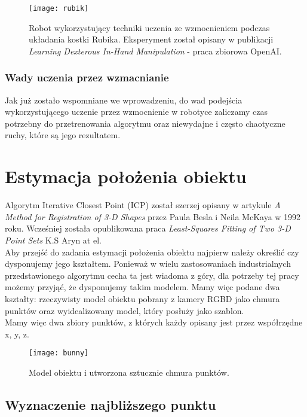\documentclass[12pt]{article}
\begin{document}
\begin{figure}[h]
\centering
\texttt{[image: rubik]}
\caption{Robot wykorzystujący techniki uczenia ze wzmocnieniem podczas układania kostki Rubika. Eksperyment został opisany w publikacji \emph{Learning Dexterous In-Hand Manipulation} - praca zbiorowa OpenAI.}
\end{figure}

\subsubsection{Wady uczenia przez wzmacnianie}
Jak już zostało wspomniane we wprowadzeniu, do wad podejścia wykorzystującego uczenie przez wzmocnienie w robotyce zaliczamy czas potrzebny do przetrenowania algorytmu oraz niewydajne i często chaotyczne ruchy, które są jego rezultatem.

\newpage
\section{Estymacja położenia obiektu}
Algorytm Iterative Closest Point (ICP) został szerzej opisany w artykule \emph{A Method for Registration of 3-D Shapes} przez Paula Besla i Neila McKaya w 1992 roku. Wcześniej została opublikowana praca \emph{Least-Squares Fitting of Two 3-D Point Sets} K.S Aryn at el. 
\\
Aby przejść do zadania estymacji położenia obiektu najpierw należy określić czy dysponujemy jego kształtem. Ponieważ w wielu zastosowaniach industrialnych przedstawionego algorytmu cecha ta jest wiadoma z góry, dla potrzeby tej pracy możemy przyjąć, że dysponujemy takim modelem. Mamy więc podane dwa kształty: rzeczywisty model obiektu pobrany z kamery RGBD jako chmura punktów oraz wyidealizowany model, który posłuży jako szablon.
\\
Mamy więc dwa zbiory punktów, z których każdy opisany jest przez współrzędne x, y, z.

\begin{figure}[h]
\centering
\texttt{[image: bunny]}
\caption{Model obiektu i utworzona sztucznie chmura punktów.}
\end{figure}

\subsection{Wyznaczenie najbliższego punktu}
\end{document}
